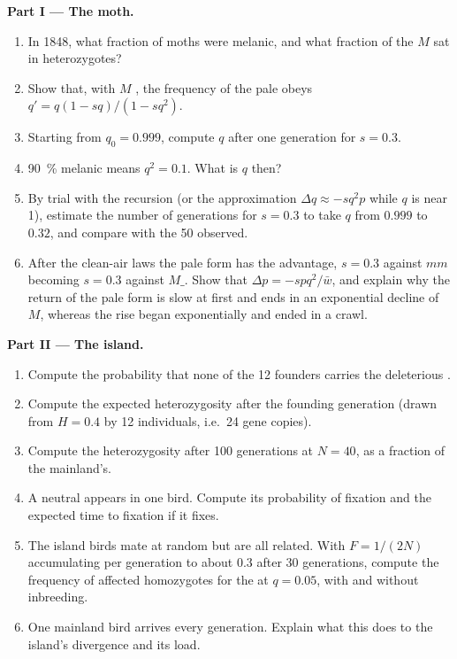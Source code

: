 \begin{problem}
\medskip
\noindent\textbf{Part I --- The moth.}
\begin{enumerate}
  \item In 1848, what fraction of moths were melanic, and what
        fraction of the $M$  sat in heterozygotes?
  \item Show that, with $M$ , the frequency of the pale
         obeys $q' = q(1 - sq)/(1 - sq^{2})$.
  \item Starting from $q_0 = 0.999$, compute $q$ after one generation
        for $s = 0.3$.
  \item \qty{90}{\%} melanic means $q^{2} = 0.1$. What is $q$ then?
  \item By trial with the recursion (or the approximation
        $\Delta q \approx -sq^{2}p$ while $q$ is near 1), estimate the
        number of generations for $s = 0.3$ to take $q$ from $0.999$
        to $0.32$, and compare with the 50 observed.
  \item After the clean-air laws the pale form has the advantage, $s
        = 0.3$ against $mm$ becoming $s = 0.3$ against $M\_$. Show
        that $\Delta p = -spq^{2}/\bar w$, and explain why the return
        of the pale form is slow at first and ends in an exponential
        decline of $M$, whereas the rise began exponentially and
        ended in a crawl.
\end{enumerate}

\medskip
\noindent\textbf{Part II --- The island.}
\begin{enumerate}[resume]
  \item Compute the probability that none of the 12 founders carries
        the deleterious .
  \item Compute the expected heterozygosity after the founding
        generation (drawn from $H = 0.4$ by 12 individuals, i.e.\ 24
        gene copies).
  \item Compute the heterozygosity after 100 generations at $N =
        40$, as a fraction of the mainland's.
  \item A neutral  appears in one bird. Compute its
        probability of fixation and the expected time to fixation if
        it fixes.
  \item The island birds mate at random but are all related. With
        $F = 1/(2N)$ accumulating per generation to about $0.3$ after
        30 generations, compute the frequency of affected homozygotes
        for the  at $q = 0.05$, with and without inbreeding.
  \item One mainland bird arrives every generation. Explain what this
        does to the island's divergence and its load.
\end{enumerate}


\end{problem}
